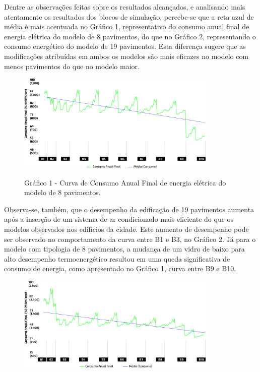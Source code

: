 \begin{onehalfspace}
    \noindent Dentre as observações feitas sobre os resultados alcançados, e analisando mais atentamente os resultados dos blocos de simulação, percebe-se que a reta azul de média é mais acentuada no Gráfico 1, representativo do consumo anual final de energia elétrica do modelo de 8 pavimentos, do que no Gráfico 2, representando o consumo energético do modelo de 19 pavimentos. Esta diferença sugere que as modificações atribuídas em ambos os modelos são mais eficazes no modelo com menos pavimentos do que no modelo maior.\vspace*{0.3cm}
    \begin{figure}[ht]
        \centering
        \includegraphics[width=0.85\textwidth]{figures/grafico-8pav.png}
        \begin{center}
            \scriptsize Gráfico 1 - Curva de Consumo Anual Final de energia elétrica do modelo de 8 pavimentos.
        \end{center}
    \end{figure}
    \noindent Observa-se, também, que o desempenho da edificação de 19 pavimentos aumenta após a inserção de um sistema de ar condicionado mais eficiente do que os modelos observados nos edifícios da cidade. Este aumento de desempenho pode ser observado no comportamento da curva entre B1 e B3, no Gráfico 2. Já para o modelo com tipologia de 8 pavimentos, a mudança de um vidro de baixo para alto desempenho termoenergético resultou em uma queda significativa de consumo de energia, como apresentado no Gráfico 1, curva entre B9 e B10.\vspace*{0.3cm}
    \begin{figure}[ht]
        \centering
        \includegraphics[width=0.85\textwidth]{figures/grafico-19pav.png}

\end{figure}
\end{onehalfspace}
